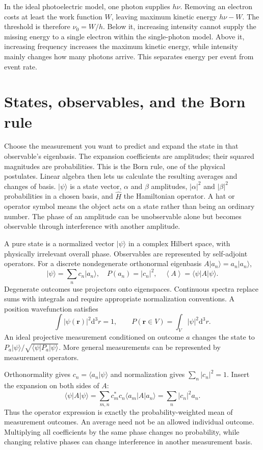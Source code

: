 \documentclass[11pt,oneside]{book}
\newcommand{\dd}{\mathrm{d}}
\newcommand{\vect}[1]{\boldsymbol{#1}}
\newcommand{\avg}[1]{\left\langle #1\right\rangle}
\newcommand{\ket}[1]{\lvert #1\rangle}
\newcommand{\bra}[1]{\langle #1\rvert}
\theoremstyle{reviewstyle}
\begin{document}
In the ideal photoelectric model, one photon supplies $h\nu$. Removing an electron costs at least the work function $W$, leaving maximum kinetic energy $h\nu-W$. The threshold is therefore $\nu_0=W/h$. Below it, increasing intensity cannot supply the missing energy to a single electron within the single-photon model. Above it, increasing frequency increases the maximum kinetic energy, while intensity mainly changes how many photons arrive. This separates energy per event from event rate.

\section{States, observables, and the Born rule}
Choose the measurement you want to predict and expand the state in that observable's eigenbasis. The expansion coefficients are amplitudes; their squared magnitudes are probabilities. This is the Born rule, one of the physical postulates. Linear algebra then lets us calculate the resulting averages and changes of basis. $\ket\psi$ is a state vector, $\alpha$ and $\beta$ amplitudes, $|\alpha|^2$ and $|\beta|^2$ probabilities in a chosen basis, and $\hat H$ the Hamiltonian operator. A hat or operator symbol means the object acts on a state rather than being an ordinary number. The phase of an amplitude can be unobservable alone but becomes observable through interference with another amplitude.

A pure state is a normalized vector $\ket\psi$ in a complex Hilbert space, with physically irrelevant overall phase. Observables are represented by self-adjoint operators. For a discrete nondegenerate orthonormal eigenbasis $A\ket{a_n}=a_n\ket{a_n}$,
\begin{equation}
\ket\psi=\sum_n c_n\ket{a_n},\quad
P(a_n)=|c_n|^2,\quad \avg A=\bra\psi A\ket\psi.
\end{equation}
Degenerate outcomes use projectors onto eigenspaces. Continuous spectra replace sums with integrals and require appropriate normalization conventions. A position wavefunction satisfies
\begin{equation}\int|\psi(\vect r)|^2\dd^3r=1,\qquad P(\vect r\in V)=\int_V|\psi|^2\dd^3r.\end{equation}
An ideal projective measurement conditioned on outcome $a$ changes the state to $P_a\ket\psi/\sqrt{\bra\psi P_a\ket\psi}$. More general measurements can be represented by measurement operators.

Orthonormality gives $c_n=\bra{a_n}\psi\rangle$ and normalization gives $\sum_n|c_n|^2=1$. Insert the expansion on both sides of $A$:
\begin{equation}
\bra\psi A\ket\psi
=\sum_{m,n}c_m^*c_n\bra{a_m}A\ket{a_n}
=\sum_n|c_n|^2a_n.
\end{equation}
Thus the operator expression is exactly the probability-weighted mean of measurement outcomes. An average need not be an allowed individual outcome. Multiplying all coefficients by the same phase changes no probability, while changing relative phases can change interference in another measurement basis.
\end{document}
